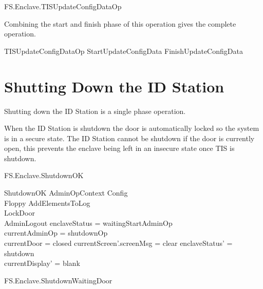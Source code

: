 \begin{traceunit}{FS.Enclave.TISUpdateConfigDataOp}
\end{traceunit}

Combining the start and finish phase of this operation gives the
complete operation.

\begin{zed}
        TISUpdateConfigDataOp  StartUpdateConfigData \lor FinishUpdateConfigData
\end{zed}


\section{Shutting Down the ID Station}

Shutting down the ID Station is a single phase operation.

When the ID Station is shutdown the door is automatically locked so
the system is in a secure state. The ID Station cannot be shutdown if
the door is currently open, this prevents the enclave being left in an
insecure state once TIS is shutdown.

\begin{traceunit}{FS.Enclave.ShutdownOK}
\end{traceunit}


\begin{schema}{ShutdownOK}
        AdminOpContext
\also   
        \Xi Config
\\      \Xi Floppy
\also
        AddElementsToLog
\\      LockDoor
\\      AdminLogout
\where
        enclaveStatus = waitingStartAdminOp
\\      \The currentAdminOp = shutdownOp
\\      currentDoor = closed
\also
        currentScreen'.screenMsg = clear
\also
        enclaveStatus' = shutdown
\\      currentDisplay' = blank
\end{schema}


\begin{traceunit}{FS.Enclave.ShutdownWaitingDoor}
\end{traceunit}

